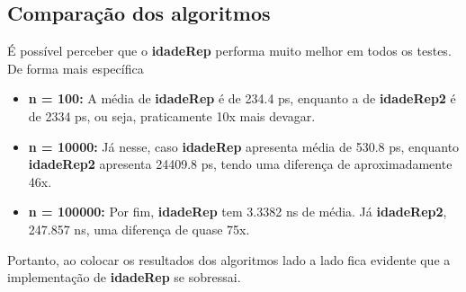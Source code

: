 \subsection{Comparação dos algoritmos}

É possível perceber que o \textbf{idadeRep} performa muito melhor em todos os testes. De forma mais específica

\begin{itemize}
  \item \textbf{n = 100:} A média de \textbf{idadeRep} é de 234.4 ps, enquanto a de \textbf{idadeRep2} é de 2334 ps, ou seja, praticamente 10x mais devagar.

  \item \textbf{n = 10000:} Já nesse, caso \textbf{idadeRep} apresenta média de 530.8 ps, enquanto \textbf{idadeRep2} apresenta 24409.8 ps, tendo uma diferença de aproximadamente 46x.

  \item \textbf{n = 100000:} Por fim, \textbf{idadeRep} tem 3.3382 ns de média. Já \textbf{idadeRep2}, 247.857 ns, uma diferença de quase 75x.
\end{itemize}

Portanto, ao colocar os resultados dos algoritmos lado a lado fica evidente que a implementação de \textbf{idadeRep} se sobressai.
